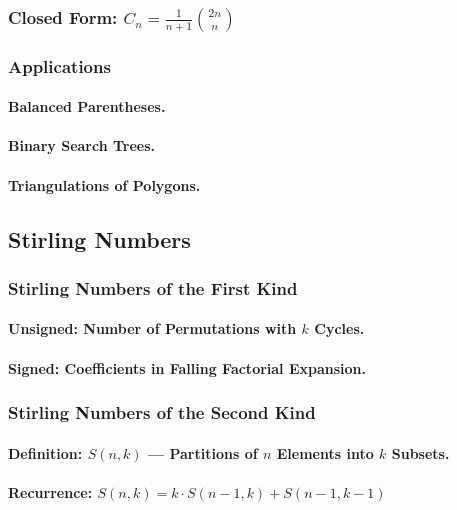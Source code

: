 \subsubsection{Closed Form: $C_n = \frac{1}{n+1}\binom{2n}{n}$}
\subsubsection{Applications}
\paragraph{Balanced Parentheses.}
\paragraph{Binary Search Trees.}
\paragraph{Triangulations of Polygons.}

\subsection{Stirling Numbers}
\label{subsec:stirling}

\subsubsection{Stirling Numbers of the First Kind}
\paragraph{Unsigned: Number of Permutations with $k$ Cycles.}
\paragraph{Signed: Coefficients in Falling Factorial Expansion.}

\subsubsection{Stirling Numbers of the Second Kind}
\paragraph{Definition: $S(n,k)$ — Partitions of $n$ Elements into $k$ Subsets.}
\paragraph{Recurrence: $S(n,k) = k \cdot S(n-1,k) + S(n-1,k-1)$}


